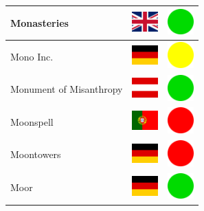 \documentclass[12pt, a4paper, twoside]{report}
\begin{document}
\begin{center}
\begin{longtable}{|p{5cm}|p{2cm}|p{2cm}|}
 Monasteries                                                & \includegraphics[width=1cm]{../4x3/gb} &   \includegraphics[width=1cm]{../likes/y} \\ \hline
 Mono Inc.                                                  & \includegraphics[width=1cm]{../4x3/de} &   \includegraphics[width=1cm]{../likes/m} \\ \hline
 Monument of Misanthropy                                    & \includegraphics[width=1cm]{../4x3/at} &   \includegraphics[width=1cm]{../likes/y} \\ \hline
 Moonspell                                                  & \includegraphics[width=1cm]{../4x3/pt} &   \includegraphics[width=1cm]{../likes/n} \\ \hline
 Moontowers                                                 & \includegraphics[width=1cm]{../4x3/de} &   \includegraphics[width=1cm]{../likes/n} \\ \hline
 Moor                                                       & \includegraphics[width=1cm]{../4x3/de} &   \includegraphics[width=1cm]{../likes/y} \\ \hline

\end{longtable}
\end{center}
\end{document}
